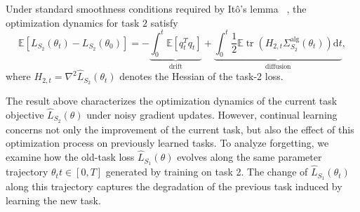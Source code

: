 \documentclass{article}
\begin{document}
Under standard smoothness conditions required by Itô's lemma ~\cite{oksendal2003stochastic}, the optimization dynamics for task $2$ satisfy
~\cite{zhu2019anisotropicnoisestochasticgradient}
\begin{equation}
    \mathbb{E}\left[L_{S_2}\left(\theta_t\right)-L_{S_2}\left(\theta_0\right)\right]=-
    \underbrace{\int_0^t \mathbb{E}\left[q_t^T q_t\right]}_{\text{drift}}
    +\underbrace{\int_0^t \frac{1}{2} \mathbb{E} \operatorname{tr}\left(H_{2,t} \Sigma^{\mathrm{alg}}_{S_2}(\theta_t)\right) \mathrm{d}t}_{\text{diffusion}},
\label{eq: current task energy}
\end{equation}
where $H_{2,t}=\nabla^2 \hat L_{S_2}(\theta_t)$ denotes the Hessian of the task-2 loss.










The result above characterizes the optimization dynamics of the current task objective $\hat L_{S_2}(\theta)$ under noisy gradient updates.
However, continual learning concerns not only the improvement of the current task, but also the effect of this optimization process on previously learned tasks. To analyze forgetting, we examine how the old-task loss $\hat L_{S_1}(\theta)$ evolves along the same parameter trajectory ${\theta_t}{t\in[0,T]}$ generated by training on task 2.
The change of $\hat L_{S_1}(\theta_t)$ along this trajectory captures the degradation of the previous task induced by learning the new task.
\end{document}
